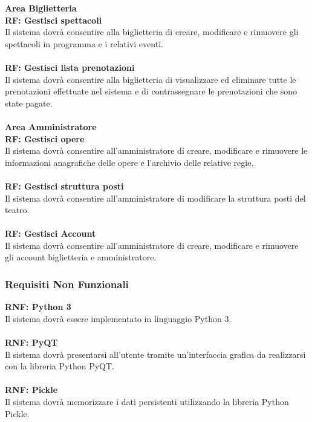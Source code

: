			\noindent \textbf{Area Biglietteria} \\
			\textbf{RF: Gestisci spettacoli} \\ 
			Il sistema dovrà consentire alla biglietteria di creare, modificare e rimuovere gli spettacoli in programma e i relativi eventi. \\ \\
			\textbf{RF: Gestisci lista prenotazioni} \\ 
			Il sistema dovrà consentire alla biglietteria di visualizzare ed eliminare tutte le prenotazioni effettuate nel sistema e di contrassegnare le prenotazioni che sono state pagate. \\ \\
			
			\noindent \textbf{Area Amministratore} \\
			\textbf{RF: Gestisci opere} \\ 
			Il sistema dovrà consentire all'amministratore di creare, modificare e rimuovere le informazioni anagrafiche delle opere e l'archivio delle relative regie. \\ \\
			\textbf{RF: Gestisci struttura posti} \\ 
			Il sistema dovrà consentire all'amministratore di modificare la struttura posti del teatro. \\ \\
			\textbf{RF: Gestisci Account} \\
			Il sistema dovrà consentire all'amministratore di creare, modificare e rimuovere gli account biglietteria e amministratore. \\	

		\subsubsection{Requisiti Non Funzionali}
			
			\textbf{RNF: Python 3} \\ Il sistema dovrà essere implementato in linguaggio Python 3. \\ \\
			\textbf{RNF: PyQT} \\ Il sistema dovrà presentarsi all'utente tramite un'interfaccia grafica da realizzarsi con la libreria Python PyQT. \\ \\
			\textbf{RNF: Pickle} \\ Il sistema dovrà memorizzare i dati persistenti utilizzando la libreria Python Pickle. \\
			\newpage
	
